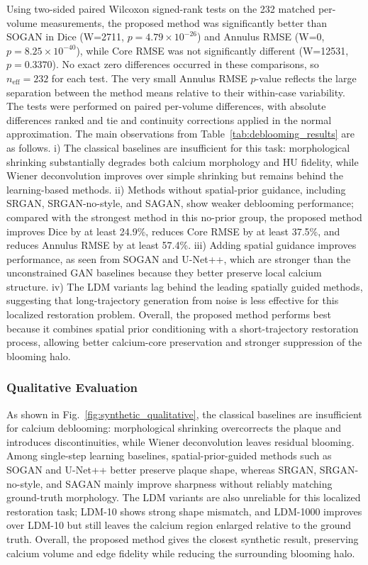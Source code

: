 \documentclass[singleLetter,times]{sagej}
\begin{document}
Using two-sided paired Wilcoxon signed-rank tests on the 232 matched per-volume measurements, the proposed method was significantly better than SOGAN in Dice (W=2711, $p=4.79\times10^{-26}$) and Annulus RMSE (W=0, $p=8.25\times10^{-40}$), while Core RMSE was not significantly different (W=12531, $p=0.3370$). No exact zero differences occurred in these comparisons, so $n_{\mathrm{eff}}=232$ for each test. The very small Annulus RMSE $p$-value reflects the large separation between the method means relative to their within-case variability. The tests were performed on paired per-volume differences, with absolute differences ranked and tie and continuity corrections applied in the normal approximation.
The main observations from Table~\ref{tab:deblooming_results} are as follows. i) The classical baselines are insufficient for this task: morphological shrinking substantially degrades both calcium morphology and HU fidelity, while Wiener deconvolution improves over simple shrinking but remains behind the learning-based methods. ii) Methods without spatial-prior guidance, including SRGAN, SRGAN-no-style, and SAGAN, show weaker deblooming performance; compared with the strongest method in this no-prior group, the proposed method improves Dice by at least 24.9\%, reduces Core RMSE by at least 37.5\%, and reduces Annulus RMSE by at least 57.4\%. iii) Adding spatial guidance improves performance, as seen from SOGAN and U-Net++, which are stronger than the unconstrained GAN baselines because they better preserve local calcium structure. iv) The LDM variants lag behind the leading spatially guided methods, suggesting that long-trajectory generation from noise is less effective for this localized restoration problem. Overall, the proposed method performs best because it combines spatial prior conditioning with a short-trajectory restoration process, allowing better calcium-core preservation and stronger suppression of the blooming halo.

\subsubsection{Qualitative Evaluation}
As shown in Fig.~\ref{fig:synthetic_qualitative}, the classical baselines are insufficient for calcium deblooming: morphological shrinking overcorrects the plaque and introduces discontinuities, while Wiener deconvolution leaves residual blooming. Among single-step learning baselines, spatial-prior-guided methods such as SOGAN and U-Net++ better preserve plaque shape, whereas SRGAN, SRGAN-no-style, and SAGAN mainly improve sharpness without reliably matching ground-truth morphology. The LDM variants are also unreliable for this localized restoration task; LDM-10 shows strong shape mismatch, and LDM-1000 improves over LDM-10 but still leaves the calcium region enlarged relative to the ground truth. Overall, the proposed method gives the closest synthetic result, preserving calcium volume and edge fidelity while reducing the surrounding blooming halo.
\end{document}
